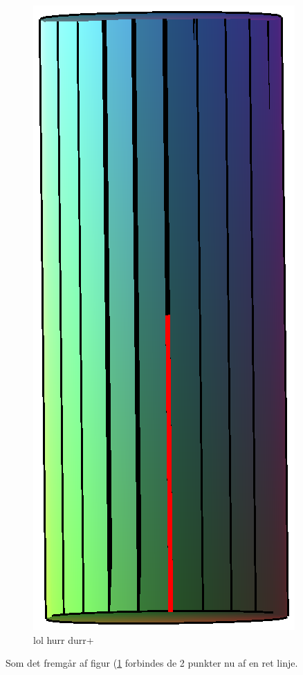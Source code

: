 \begin{figure}\label{eq:GeoPlot4}
\center
\includegraphics[scale=0.4]{pictures/Opg8_Fig4.eps}
\caption{lol hurr durr+}
\end{figure}
Som det fremgår af figur (\ref{eq:GeoPlot4} forbindes de 2 punkter nu af en ret linje.

